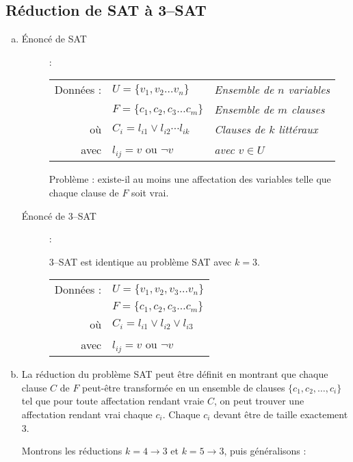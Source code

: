 \subsection{Réduction de SAT à 3--SAT}
\begin{enumerate}[(a)]
\item \begin{description}
\item[Énoncé de SAT] : \\
\begin{tabular}{r l l}
Données : & $ U = \lbrace v_1, v_2 \ldots v_n \rbrace $ & \emph{Ensemble de $n$ variables}\\
& $ F = \lbrace c_1, c_2, c_3 \ldots c_m \rbrace $ & \emph{Ensemble de $m$ clauses}\\
où & $ C_i = l_{i1} \vee l_{i2} \cdots l_{ik} $ & \emph{Clauses de $k$ littéraux}\\
avec & $ l_{ij} = v$ ou $ \neg v $ & \emph{avec $v \in U$} \\
\end{tabular}

Problème : existe-il au moins une affectation des variables telle que chaque clause de $F$ soit vrai.

\item [Énoncé de 3--SAT] : 

3--SAT est identique au problème SAT avec $k = 3$.\\
\begin{tabular}{r l}
Données : & $ U = \lbrace v_1, v_2, v_3 \ldots v_n \rbrace $\\
& $ F = \lbrace c_1, c_2, c_3 \ldots c_m \rbrace $\\
où & $ C_i = l_{i1} \vee l_{i2} \vee l_{i3} $\\
avec & $ l_{ij} = v$ ou $ \neg v$\\
\end{tabular}
\end{description}
\item La réduction du problème SAT peut être définit en montrant que chaque clause $C$ de $F$ peut-être transformée en un ensemble de clauses $\lbrace c_1, c_2, \ldots, c_i \rbrace$ tel que pour toute affectation rendant vraie $C$, on peut trouver une affectation rendant vrai chaque $c_i$. Chaque $c_i$ devant être de taille exactement 3.%

Montrons les réductions $k = 4 \rightarrow 3$ et $k = 5 \rightarrow 3$, puis généralisons :

\end{enumerate}
